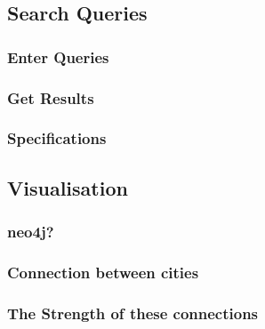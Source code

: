 \subsection{Search Queries}

\subsubsection{Enter Queries}
\subsubsection{Get Results}
\subsubsection{Specifications}

\subsection{Visualisation}
\subsubsection{neo4j?}

\subsubsection{Connection between cities}
\subsubsection{The Strength of these connections}